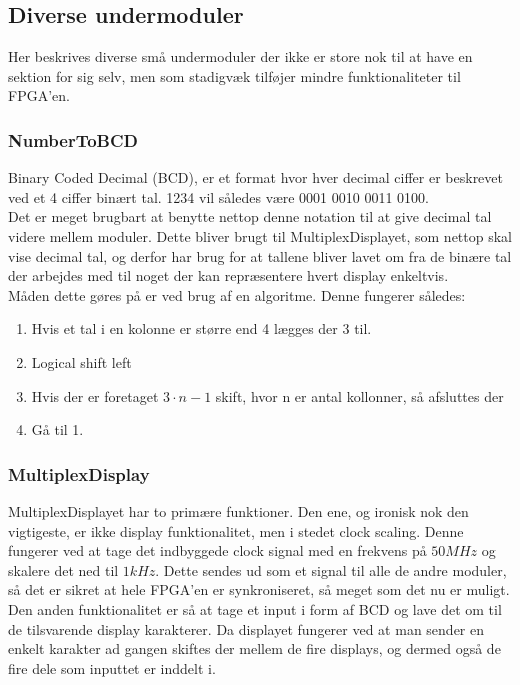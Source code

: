 \subsection{Diverse undermoduler}
Her beskrives diverse små undermoduler der ikke er store nok til at have en sektion for sig selv, men som stadigvæk tilføjer mindre funktionaliteter til FPGA'en.

\subsubsection{NumberToBCD}

Binary Coded Decimal (BCD), er et format hvor hver decimal ciffer er beskrevet ved et 4 ciffer binært tal. 1234 vil således være 0001 0010 0011 0100.
\\
Det er meget brugbart at benytte nettop denne notation til at give decimal tal videre mellem moduler. Dette bliver brugt til MultiplexDisplayet, som nettop skal vise decimal tal, og derfor har brug for at tallene bliver lavet om fra de binære tal der arbejdes med til noget der kan repræsentere hvert display enkeltvis.
\\
Måden dette gøres på er ved brug af en algoritme. Denne fungerer således:

\begin{enumerate}[noitemsep]
\item Hvis et tal i en kolonne er større end 4 lægges der 3 til.
\item Logical shift left
\item Hvis der er foretaget $3 \cdot n - 1$ skift, hvor n er antal kollonner, så afsluttes der
\item Gå til 1.
\end{enumerate}

\subsubsection{MultiplexDisplay}

MultiplexDisplayet har to primære funktioner. Den ene, og ironisk nok den vigtigeste, er ikke display funktionalitet, men i stedet clock scaling. Denne fungerer ved at tage det indbyggede clock signal med en frekvens på $50 MHz$ og skalere det ned til $1 kHz$. Dette sendes ud som et signal til alle de andre moduler, så det er sikret at hele FPGA'en er synkroniseret, så meget som det nu er muligt.
\\
Den anden funktionalitet er så at tage et input i form af BCD og lave det om til de tilsvarende display karakterer. Da displayet fungerer ved at man sender en enkelt karakter ad gangen skiftes der mellem de fire displays, og dermed også de fire dele som inputtet er inddelt i.

